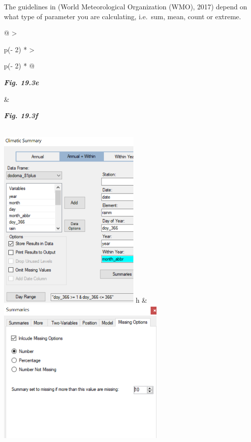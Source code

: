 \documentclass[
  letterpaper,
  DIV=11,
  numbers=noendperiod]{scrreprt}
\begin{document}
The guidelines in (World Meteorological Organization (WMO), 2017) depend
on what type of parameter you are calculating, i.e.~sum, mean, count or
extreme.

\begin{longtable}[]{@{}
  >{\raggedright\arraybackslash}p{(\columnwidth - 2\tabcolsep) * }
  >{\raggedright\arraybackslash}p{(\columnwidth - 2\tabcolsep) * }@{}}
\toprule\noalign{}
\begin{minipage}[b]{\linewidth}\raggedright
\textbf{\emph{Fig. 19.3e}}
\end{minipage} & \begin{minipage}[b]{\linewidth}\raggedright
\textbf{\emph{Fig. 19.3f}}
\end{minipage} \\
\midrule\noalign{}
\endhead
\bottomrule\noalign{}
\endlastfoot
\includegraphics[width=2.73937in,height=3.50534in]{figures/Fig19.3e.png}
h &
\includegraphics[width=3.22799in,height=\textheight]{figures/Fig19.3f.png} \\
\end{longtable}
\end{document}
